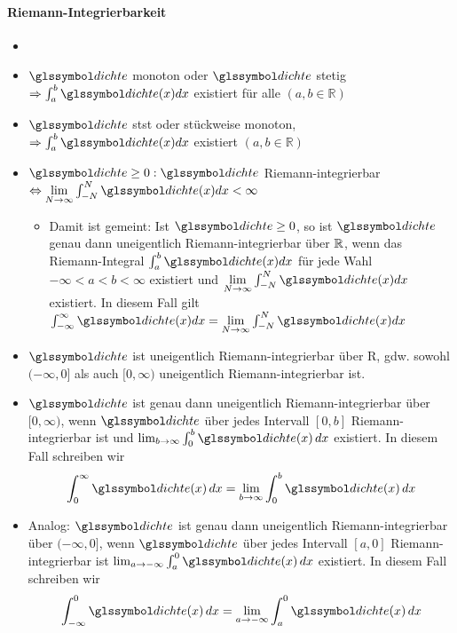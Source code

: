 \begin{bem}
      

    \paragraph{Riemann-Integrierbarkeit}
    \begin{itemize}
        \item  %
        \item $\dcht$ monoton oder $\dcht$ stetig $\Rightarrow \int_a^b \dcht(x) dx$ existiert für alle $(a, b \in \mathbb{R})$
        \item $\dcht$ \gls{stst} oder stückweise monoton, $\Rightarrow \int_a^b \dcht(x) dx$ existiert
        $(a, b \in \mathbb{R})$
        \item $\dcht \geq 0:\dcht $ Riemann-integrierbar
        $\Leftrightarrow \underset{N \rightarrow \infty}{\lim} \int_{-N}^N \dcht(x) dx < \infty$
        \begin{itemize}
            \item Damit ist gemeint: Ist $\dcht \geq 0$, so ist $\dcht$ genau dann uneigentlich Riemann-integrierbar über
            $\mathbb{R}$, wenn das Riemann-Integral $\int_a^b \dcht(x) dx$ für jede Wahl $- \infty < a < b < \infty$
            existiert und $\underset{N \rightarrow \infty}{\lim} \int_{-N}^N \dcht(x) dx$
            existiert.
            In diesem Fall gilt $\int_{- \infty}^{\infty} \dcht(x) dx = \underset{N \rightarrow \infty}{\lim} \int_{-N}^N \dcht(x) dx$
        \end{itemize}
        \item $\dcht$ ist uneigentlich Riemann-integrierbar über R, gdw.
        sowohl $(- \infty, 0] $ als auch $[0, \infty)$
        uneigentlich Riemann-integrierbar ist.
        \item $\dcht$ ist genau dann uneigentlich Riemann-integrierbar über $[0,\infty)$, wenn $\dcht$ über
        jedes Intervall $[0,b]$ Riemann-integrierbar ist und $\lim_{b \rightarrow \infty} \int_0^b \dcht(x) \dx$
        existiert.
        In diesem Fall schreiben wir
        \[
            \int^{\infty}_0 \dcht (x) \dx =  \lim_{b \rightarrow \infty} \int_0^b \dcht(x) \dx
        \]
        \item Analog: $\dcht$ ist genau dann uneigentlich Riemann-integrierbar über $(-\infty, 0]$, wenn $\dcht$
        über jedes Intervall $[a,0]$ Riemann-integrierbar ist $\lim_{a \rightarrow -\infty} \int_a^0 \dcht(x) \dx$ existiert.
        In diesem Fall schreiben wir
        \[
            \int_{-\infty}^0 \dcht (x) \dx =  \lim_{a \rightarrow - \infty} \int_a^0 \dcht(x) \dx
        \]
    \end{itemize}
\end{bem}


